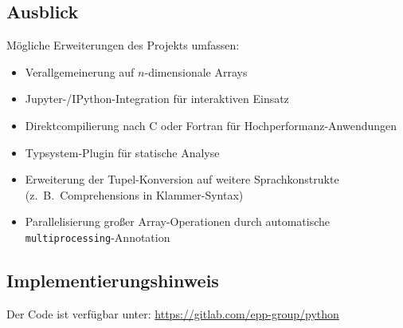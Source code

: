 \documentclass[a4paper,12pt]{article}
\theoremstyle{definition}
\begin{document}
\subsection{Ausblick}

M\"ogliche Erweiterungen des Projekts umfassen:

\begin{itemize}
	\item Verallgemeinerung auf $n$-dimensionale Arrays
	\item Jupyter-/IPython-Integration f\"ur interaktiven Einsatz
	\item Direktcompilierung nach C oder Fortran f\"ur Hochperformanz-Anwendungen
	\item Typsystem-Plugin f\"ur statische Analyse
	\item Erweiterung der Tupel-Konversion auf weitere Sprachkonstrukte (z.\ B.\
	      Comprehensions in Klammer-Syntax)
	\item Parallelisierung gro\ss{}er Array-Operationen durch automatische
	      \texttt{multiprocessing}-Annotation
\end{itemize}

\subsection{Implementierungshinweis}

Der Code ist verf\"ugbar unter:
\url{https://gitlab.com/epp-group/python}
\end{document}
